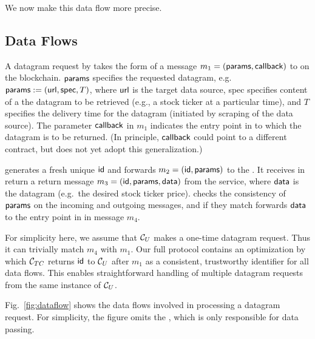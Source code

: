 \noindent We now make this data flow more precise. 

\subsection{Data Flows}

A datagram request by \reqcont takes the form of a message $m_1 = ({\sf params}, {\sf callback})$ to \tcont on the blockchain. ${\sf params}$ specifies the requested datagram, e.g.~${\sf params} := ({{\sf url}}, {\sf spec}, T)$, where ${{\sf url}}$ is the target data source, {\sf spec} specifies content of a the datagram to be retrieved (e.g., a stock ticker at a particular time), and $T$ specifies the delivery time for the datagram (initiated by scraping of the data source). The parameter ${\sf callback}$ in $m_1$ indicates the entry point in \reqcont to which the datagram is to be returned. (In principle, ${\sf callback}$ could point to a different contract, but \tc does not yet adopt this generalization.) 

\tcont generates a fresh unique ${\sf id}$ and forwards $m_2 = ({\sf id}, {\sf params})$ to the \encname. It receives in return a return message $m_3 = ({\sf id}, {\sf params}, {\sf data})$ from the \tc service, where ${\sf data}$ is the datagram (e.g.~the desired stock ticker price). \tcont checks the consistency of ${\sf params}$ on the incoming and outgoing messages, and if they match forwards ${\sf data}$ to the entry point \dgcallback in \reqcont in message $m_4$.

For simplicity here, we assume that ${\cal C}_U$ makes a one-time datagram request. Thus it can trivially match $m_4$ with $m_1$. Our full protocol contains an optimization by which ${\cal C}_{TC}$ returns ${\sf id}$ to ${\cal C}_U$ after $m_1$ as a consistent, trustworthy identifier for all data flows. This enables straightforward handling of multiple datagram requests from the same instance of ${\cal C}_U$.

Fig.~\ref{fig:dataflow} shows the data flows involved in processing a datagram request. For simplicity, the figure omits the \medname, which is only responsible for data passing.


